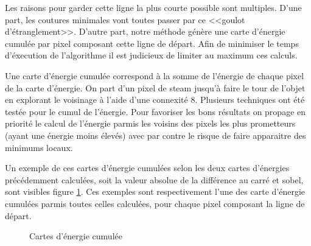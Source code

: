 \documentclass[a4paper]{article}
\begin{document}
Les raisons pour garder cette ligne la plus courte possible sont multiples. D'une part, les coutures minimales
vont toutes passer par ce <<goulot d'étranglement>>. D'autre part, notre méthode génère une carte d'énergie
cumulée par pixel composant cette ligne de départ. Afin de minimiser le temps d'éxecution de l'algorithme il
est judicieux de limiter au maximum ces calculs.

Une carte d’énergie cumulée correspond à la somme de l'énergie de chaque pixel de la carte d'énergie. 
On part d’un pixel de steam jusqu’à faire le tour de l’objet en explorant le voisinage à l'aide d'une connexité 8.
Plusieurs techniques ont été testée pour le cumul de l'énergie. Pour favoriser les bons résultats on propage
en priorité le calcul de l'énergie parmis les voisins des pixels les plus prometteurs (ayant une énergie moins élevés) 
avec par contre le risque de faire apparaitre des minimums locaux.

Un exemple de ces cartes d'énergie cumulées selon les deux cartes d'énergies précédemment calculées, soit la
valeur absolue de la différence au carré et sobel, sont visibles figure \ref{ecum}. Ces exemples sont
respectivement l'une des carte d'énergie cumulées parmis toutes celles calculées, pour chaque pixel composant la ligne de départ.

\begin{figure}[!ht]%
    \centering
    \hspace{0.030\textwidth}
    \caption{Cartes d'énergie cumulée}
    \label{ecum}
\end{figure}
\end{document}
